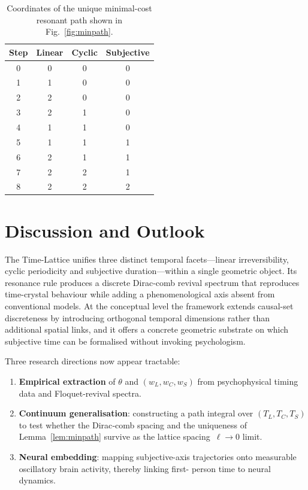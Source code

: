 \documentclass[11pt]{article}
\begin{document}
\begin{table}[htbp!]
  \centering
  \begin{tabular}{cccc}
    \toprule
    Step & Linear & Cyclic & Subjective \\
    \midrule
    0 & 0 & 0 & 0 \\
    1 & 1 & 0 & 0 \\
    2 & 2 & 0 & 0 \\
    3 & 2 & 1 & 0 \\
    4 & 1 & 1 & 0 \\
    5 & 1 & 1 & 1 \\
    6 & 2 & 1 & 1 \\
    7 & 2 & 2 & 1 \\
    8 & 2 & 2 & 2 \\
    \bottomrule
  \end{tabular}
  \caption{Coordinates of the unique minimal-cost resonant path shown in Fig.~\ref{fig:minpath}.}
  \label{tab:path}
\end{table}

\section{Discussion and Outlook}\label{sec:discussion}

The Time-Lattice unifies three distinct temporal facets—linear
irreversibility, cyclic periodicity and subjective duration—within a
single geometric object.  Its resonance rule produces a discrete
Dirac-comb revival spectrum that reproduces time-crystal behaviour while
adding a phenomenological axis absent from conventional models.  At the
conceptual level the framework extends causal-set discreteness by
introducing orthogonal temporal dimensions rather than additional spatial
links, and it offers a concrete geometric substrate on which subjective
time can be formalised without invoking psychologism.

Three research directions now appear tractable:

\begin{enumerate}
\begingroup\sloppy
\item \textbf{Empirical extraction} of $\theta$ and $(w_L,w_C,w_S)$ from
      psychophysical timing data and Floquet-revival spectra.
\item \textbf{Continuum generalisation}: constructing a path integral
      over $(T_L,\allowbreak T_C,\allowbreak T_S)$ to test whether the
      Dirac\hspace{0pt}‐\hspace{0pt}comb spacing and the uniqueness of
      Lemma~\ref{lem:minpath} survive as the lattice
      spacing~$\ell\hspace{0pt}\to\hspace{0pt}0$ limit.
      
\endgroup
\item \textbf{Neural embedding}: mapping subjective-axis trajectories
      onto measurable oscillatory brain activity, thereby linking first-
      person time to neural dynamics.
\end{enumerate}
\end{document}
